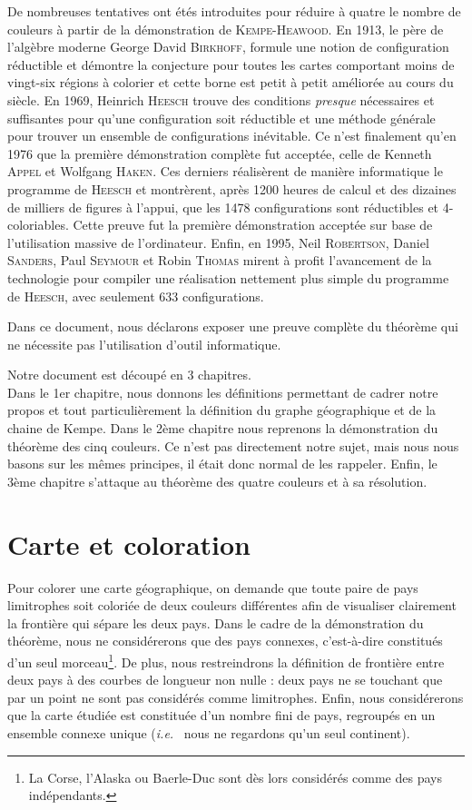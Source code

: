 \documentclass[french]{report}
\begin{document}
De nombreuses tentatives ont étés introduites pour réduire à quatre le nombre de couleurs à partir de la démonstration de \textsc{Kempe-Heawood}. En 1913, le père de l'algèbre moderne George David \textsc{Birkhoff}, formule une notion de configuration réductible et démontre la conjecture pour toutes les cartes comportant moins de vingt-six régions à colorier et cette borne est petit à petit améliorée au cours du siècle. En 1969, Heinrich \textsc{Heesch} trouve des conditions \textit{presque} nécessaires et suffisantes pour qu'une configuration soit réductible et une méthode générale pour trouver un ensemble de configurations inévitable. Ce n'est finalement qu'en 1976 que la première démonstration complète fut acceptée, celle de Kenneth \textsc{Appel} et Wolfgang \textsc{Haken}. Ces derniers réalisèrent de manière informatique le programme de \textsc{Heesch} et montrèrent, après 1200 heures de calcul et des dizaines de milliers de figures à l'appui, que les 1478 configurations sont réductibles et 4-coloriables. Cette preuve fut la première démonstration acceptée sur base de l'utilisation massive de l'ordinateur. Enfin, en 1995, Neil \textsc{Robertson}, Daniel \textsc{Sanders}, Paul \textsc{Seymour} et Robin \textsc{Thomas} mirent à profit l'avancement de la technologie pour compiler une réalisation nettement plus simple du programme de \textsc{Heesch}, avec seulement 633 configurations.

Dans ce document, nous déclarons exposer une preuve complète du théorème qui ne nécessite pas l'utilisation d'outil informatique.

Notre document est découpé en 3 chapitres.\\
Dans le 1er chapitre, nous donnons les définitions permettant de cadrer notre propos et tout particulièrement la définition du graphe géographique et de la chaine de Kempe.
Dans le 2ème chapitre nous reprenons la démonstration du théorème des cinq couleurs. Ce n'est pas directement notre sujet, mais nous nous basons sur les mêmes principes, il était donc normal de les rappeler. Enfin, le 3ème chapitre s’attaque au théorème des quatre couleurs et à sa résolution.

\section{Carte et coloration}

Pour colorer une carte géographique, on demande que toute paire de pays limitrophes soit coloriée de deux couleurs différentes afin de visualiser clairement la frontière qui sépare les deux pays. Dans le cadre de la démonstration du théorème, nous ne considérerons que des pays connexes, c'est-à-dire constitués d'un seul morceau\footnote{La Corse, l'Alaska ou Baerle-Duc sont dès lors considérés comme des pays indépendants.}. De plus, nous restreindrons la définition de frontière entre deux pays à des courbes de longueur non nulle : deux pays ne se touchant que par un point ne sont pas considérés comme limitrophes. Enfin, nous considérerons que la carte étudiée est constituée d'un nombre fini de pays, regroupés en un ensemble connexe unique (\textit{i.e.}~ nous ne regardons qu'un seul continent).
\end{document}
